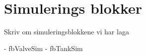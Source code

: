 \section{Simulerings blokker}
\thispagestyle{fancy}

Skriv om simuleringsblokkene vi har laga

- fbValveSim
- fbTankSim